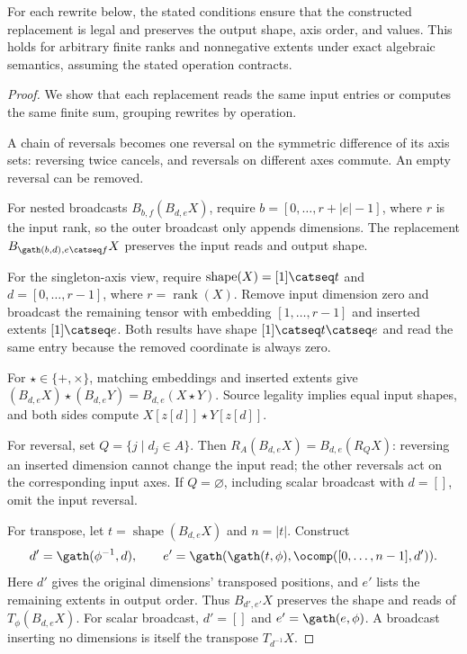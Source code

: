 \begin{lemma}
\label{lem:certified-extensions}
For each rewrite below, the stated conditions ensure that the
constructed replacement is legal and preserves the output shape,
axis order, and values. This holds for arbitrary finite ranks and
nonnegative extents under exact algebraic semantics, assuming
the stated operation contracts.
\end{lemma}
\begin{proof}
We show that each replacement reads the same input entries or computes
the same finite sum, grouping rewrites by operation.

A chain of reversals becomes one reversal on the symmetric difference
of its axis sets: reversing twice cancels, and reversals on different
axes commute. An empty reversal can be removed.

For nested broadcasts $B_{b,f}(B_{d,e}X)$, require
$b=[0,\ldots,r+|e|-1]$, where $r$ is the input rank, so the outer broadcast
only appends dimensions. The replacement $B_{\gath(b,d),e\catseq f}X$
preserves the input reads and output shape.

For the singleton-axis view, require
$\operatorname{shape}(X)=[1]\catseq t$ and $d=[0,\ldots,r-1]$,
where $r=\operatorname{rank}(X)$.
Remove input dimension zero and broadcast the remaining tensor with
embedding $[1,\ldots,r-1]$ and inserted extents $[1]\catseq e$.
Both results have shape $[1]\catseq t\catseq e$ and read the same entry
because the removed coordinate is always zero.

For $\star\in\{+,\times\}$, matching embeddings and inserted extents give
$(B_{d,e}X)\star(B_{d,e}Y)=B_{d,e}(X\star Y)$.
Source legality implies equal input shapes, and both sides compute
$X[z[d]]\star Y[z[d]]$.

For reversal, set $Q=\{j\mid d_j\in A\}$. Then
$R_A(B_{d,e}X)=B_{d,e}(R_QX)$: reversing an inserted dimension cannot
change the input read; the other reversals act on the corresponding input
axes. If $Q=\varnothing$, including scalar broadcast with $d=[]$, omit
the input reversal.

For transpose, let $t=\operatorname{shape}(B_{d,e}X)$ and $n=|t|$.
Construct
\[
 d'=\gath(\phi^{-1},d),\qquad
 e'=\gath(\gath(t,\phi),\ocomp([0,\ldots,n-1],d')).
\]
Here $d'$ gives the original dimensions' transposed positions, and $e'$
lists the remaining extents in output order. Thus $B_{d',e'}X$ preserves
the shape and reads of $T_\phi(B_{d,e}X)$.
For scalar broadcast, $d'=[]$ and
$e'=\gath(e,\phi)$. A broadcast inserting no dimensions is itself the
transpose $T_{d^{-1}}X$.


\end{proof}

